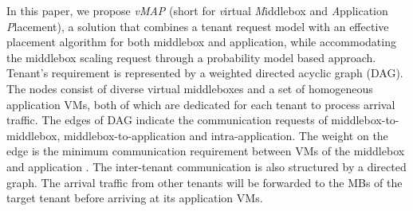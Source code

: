 \documentclass[review]{elsarticle}
\begin{document}
In this paper, we propose \emph{vMAP} (short for \emph{v}irtual \emph{M}iddlebox and \emph{A}pplication \emph{P}lacement),
a solution that combines a tenant request model with an effective placement algorithm for both middlebox and application, while accommodating the middlebox scaling request through a probability model based approach.  
Tenant's requirement is represented by a weighted directed acyclic graph (DAG). The nodes consist of diverse virtual middleboxes and a set of homogeneous application VMs, both of which are dedicated for each tenant to process arrival traffic. The edges of DAG indicate the communication requests of middlebox-to-middlebox, middlebox-to-application and intra-application. The weight on the edge is the minimum communication requirement between VMs of the middlebox and application \cite{stratos12, B11tpd}. The inter-tenant communication \cite{B13cta} is also structured by a directed graph. The arrival traffic from other tenants will be forwarded to the MBs of the target tenant before arriving at its application VMs.
\end{document}
